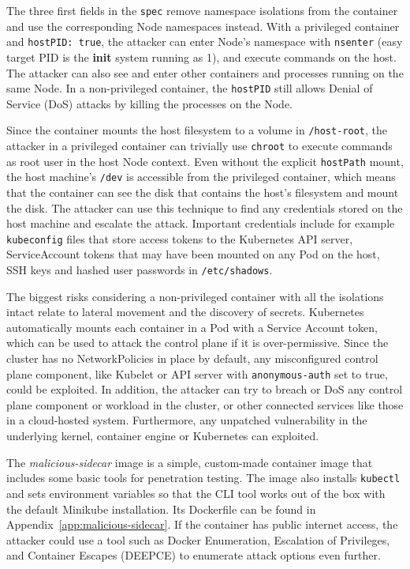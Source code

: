 \documentclass[english, 12pt, a4paper, sci, utf8, a-2b, online]{aaltothesis}
\begin{document}


The three first fields in the \lstinline{spec} remove namespace isolations from the container and use the corresponding Node namespaces instead.
With a privileged container and \lstinline{hostPID: true}, the attacker can enter Node's namespace with \lstinline{nsenter} (easy target PID is the \textbf{init} system running as 1), and execute commands on the host.
The attacker can also see and enter other containers and processes running on the same Node.
In a non-privileged container, the \lstinline{hostPID} still allows Denial of Service (DoS) attacks by killing the processes on the Node.

Since the container mounts the host filesystem to a volume in \lstinline{/host-root}, the attacker in a privileged container can trivially use \lstinline{chroot} to execute commands as root user in the host Node context.
Even without the explicit \lstinline{hostPath} mount, the host machine's \lstinline{/dev} is accessible from the privileged container, which means that the container can see the disk that contains the host's filesystem and mount the disk.
The attacker can use this technique to find any credentials stored on the host machine and escalate the attack.
Important credentials include for example \lstinline{kubeconfig} files that store access tokens to the Kubernetes API server, ServiceAccount tokens that may have been mounted on any Pod on the host, SSH keys and hashed user passwords in \lstinline{/etc/shadows}.

The biggest risks considering a non-privileged container with all the isolations intact relate to lateral movement and the discovery of secrets.
Kubernetes automatically mounts each container in a Pod with a Service Account token, which can be used to attack the control plane if it is over-permissive.
Since the cluster has no NetworkPolicies in place by default, any misconfigured control plane component, like Kubelet or API server with \lstinline{anonymous-auth} set to true, could be exploited.
In addition, the attacker can try to breach or DoS any control plane component or workload in the cluster, or other connected services like those in a cloud-hosted system.
Furthermore, any unpatched vulnerability in the underlying kernel, container engine or Kubernetes can exploited.

The \emph{malicious-sidecar} image is a simple, custom-made container image that includes some basic tools for penetration testing.
The image also installs \lstinline{kubectl} and sets environment variables so that the CLI tool works out of the box with the default Minikube installation.
Its Dockerfile can be found in Appendix~\ref{app:malicious-sidecar}.
If the container has public internet access, the attacker could use a tool such as Docker Enumeration, Escalation of Privileges, and Container Escapes (DEEPCE) \cite{deepce} to enumerate attack options even further.
\end{document}
